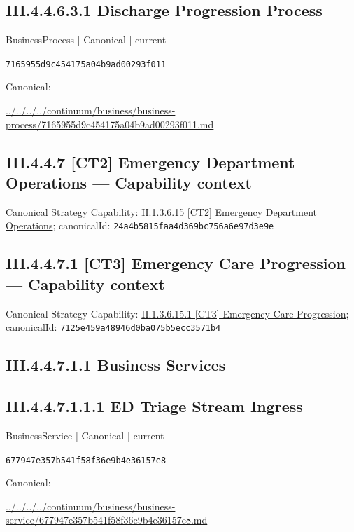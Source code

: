 \documentclass[10pt,a4paper]{article}
\begin{document}
\subsection*{III.4.4.6.3.1 Discharge Progression Process}
\label{element-7165955d9c454175a04b9ad00293f011}
{\small BusinessProcess | Canonical | current}\par
\texttt{7165955d9c454175a04b9ad00293f011}\par
Canonical: \par
{\footnotesize\url{../../../../continuum/business/business-process/7165955d9c454175a04b9ad00293f011.md}}\par
\subsection*{III.4.4.7 [CT2] Emergency Department Operations — Capability context}
Canonical Strategy Capability: \hyperref[element-24a4b5815faa4d369bc756a6e97d3e9e]{II.1.3.6.15 [CT2] Emergency Department Operations}; canonicalId: \texttt{24a4b5815faa4d369bc756a6e97d3e9e}\par
\subsection*{III.4.4.7.1 [CT3] Emergency Care Progression — Capability context}
Canonical Strategy Capability: \hyperref[element-7125e459a48946d0ba075b5ecc3571b4]{II.1.3.6.15.1 [CT3] Emergency Care Progression}; canonicalId: \texttt{7125e459a48946d0ba075b5ecc3571b4}\par
\subsection*{III.4.4.7.1.1 Business Services}
\subsection*{III.4.4.7.1.1.1 ED Triage Stream Ingress}
\label{element-677947e357b541f58f36e9b4e36157e8}
{\small BusinessService | Canonical | current}\par
\texttt{677947e357b541f58f36e9b4e36157e8}\par
Canonical: \par
{\footnotesize\url{../../../../continuum/business/business-service/677947e357b541f58f36e9b4e36157e8.md}}\par
\end{document}
